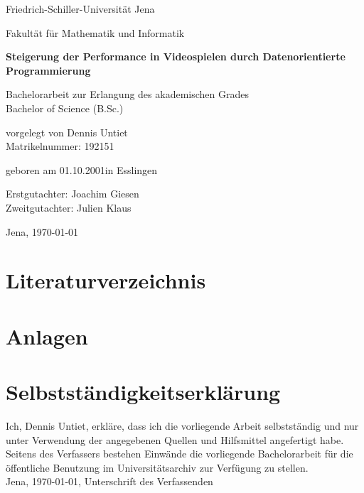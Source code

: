\documentclass[12pt, titlepage]{article}
\DeclareRobustCommand{\#}{\adjustbox{valign=B,totalheight=.57\baselineskip}{\oldhash}}%
\newcommand{\myTitle}{Steigerung der Performance in Videospielen durch Datenorientierte Programmierung}
\begin{document}
\begin{titlepage}
\centering
{\huge Friedrich-Schiller-Universität Jena \par}
{\large Fakultät für Mathematik und Informatik\par}
\vspace{1.5cm}
{\huge\bfseries \myTitle\par}
\vspace{2cm}
{\Large Bachelorarbeit zur Erlangung des akademischen Grades\\Bachelor of Science (B.Sc.) \par}
\vspace{3cm}
{\large vorgelegt von Dennis Untiet\\Matrikelnummer: 192151\par}
\vspace{0.5cm}
{\large geboren am 01.10.2001\quad in Esslingen\par}
\vspace{2cm}
{\large Erstgutachter: Joachim Giesen \\Zweitgutachter: Julien Klaus\par} 
\vfill
{\Large Jena, \today}
\end{titlepage}
\newpage 
\thispagestyle{empty}
\quad
\newpage

\newpage
\thispagestyle{empty}
\quad
\newpage
\tableofcontents
\newpage 
\thispagestyle{empty}
\quad
\newpage

\newpage

\newpage

\newpage

\newpage

\newpage

\newpage 
\thispagestyle{empty}
\quad
\newpage
\lstlistoflistings
\newpage
\listoffigures
\newpage
\section{Literaturverzeichnis}



\newpage
\section{Anlagen}
\newpage
\thispagestyle{empty}
\section*{Selbstständigkeitserklärung}
Ich, Dennis Untiet, erkläre, dass ich die vorliegende Arbeit selbstständig und nur unter Verwendung der
angegebenen Quellen und Hilfsmittel angefertigt habe.\\
Seitens des Verfassers bestehen Einwände die vorliegende Bachelorarbeit für die öffentliche Benutzung im
Universitätsarchiv zur Verfügung zu stellen.\\
Jena, \today, Unterschrift des Verfassenden
\end{document}
